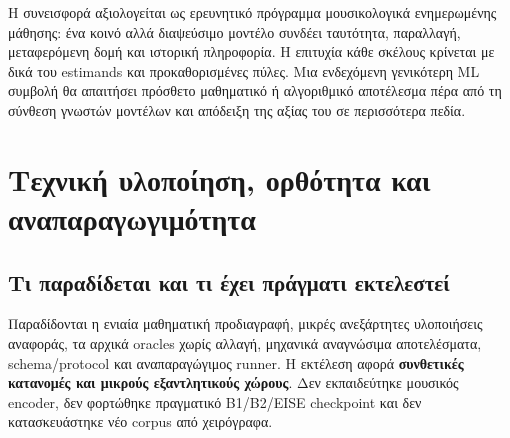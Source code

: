 \documentclass[
  10pt,
  a4paper,
]{report}
\begin{document}
Η συνεισφορά αξιολογείται ως ερευνητικό πρόγραμμα μουσικολογικά
ενημερωμένης μάθησης: ένα κοινό αλλά διαψεύσιμο μοντέλο συνδέει
ταυτότητα, παραλλαγή, μεταφερόμενη δομή και ιστορική πληροφορία. Η
επιτυχία κάθε σκέλους κρίνεται με δικά του estimands και προκαθορισμένες
πύλες. Μια ενδεχόμενη γενικότερη ML συμβολή θα απαιτήσει πρόσθετο
μαθηματικό ή αλγοριθμικό αποτέλεσμα πέρα από τη σύνθεση γνωστών μοντέλων
και απόδειξη της αξίας του σε περισσότερα πεδία.

\chapter{Τεχνική υλοποίηση, ορθότητα και
αναπαραγωγιμότητα}\label{ux3c4ux3b5ux3c7ux3bdux3b9ux3baux3ae-ux3c5ux3bbux3bfux3c0ux3bfux3afux3b7ux3c3ux3b7-ux3bfux3c1ux3b8ux3ccux3c4ux3b7ux3c4ux3b1-ux3baux3b1ux3b9-ux3b1ux3bdux3b1ux3c0ux3b1ux3c1ux3b1ux3b3ux3c9ux3b3ux3b9ux3bcux3ccux3c4ux3b7ux3c4ux3b1}

\section{Τι παραδίδεται και τι έχει πράγματι
εκτελεστεί}\label{ux3c4ux3b9-ux3c0ux3b1ux3c1ux3b1ux3b4ux3afux3b4ux3b5ux3c4ux3b1ux3b9-ux3baux3b1ux3b9-ux3c4ux3b9-ux3adux3c7ux3b5ux3b9-ux3c0ux3c1ux3acux3b3ux3bcux3b1ux3c4ux3b9-ux3b5ux3baux3c4ux3b5ux3bbux3b5ux3c3ux3c4ux3b5ux3af}

Παραδίδονται η ενιαία μαθηματική προδιαγραφή, μικρές ανεξάρτητες
υλοποιήσεις αναφοράς, τα αρχικά oracles χωρίς αλλαγή, μηχανικά
αναγνώσιμα αποτελέσματα, schema/protocol και αναπαραγώγιμος runner. Η
εκτέλεση αφορά \textbf{συνθετικές κατανομές και μικρούς εξαντλητικούς
χώρους}. Δεν εκπαιδεύτηκε μουσικός encoder, δεν φορτώθηκε πραγματικό
B1/B2/EISE checkpoint και δεν κατασκευάστηκε νέο corpus από χειρόγραφα.
\end{document}

